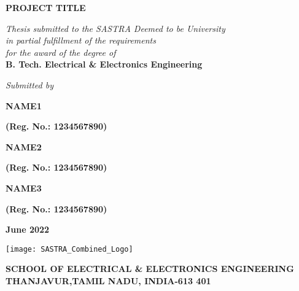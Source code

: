 \documentclass[a4paper, 12pt, oneside]{sastra}
\begin{document}
\onehalfspacing
	
	\thispagestyle{empty}
	\begin{center}
		\Large{\textbf{PROJECT TITLE}}
	\end{center}
	\bigskip{}
	\bigskip{}
	\bigskip{}
	\begin{center}
		\textit{Thesis submitted to the SASTRA Deemed to be University\\ 
			in partial fulfillment of the requirements\\
			for the award of the degree of\\
		}
		\bigskip{}
		\bigskip{}
		\large{\textbf{B. Tech. Electrical \& Electronics Engineering}}
		\bigskip{}
		\bigskip{}
		\bigskip{}
		\bigskip{}
		\bigskip{}
		\bigskip{}
	\end{center}
	\begin{center}
		\textit{Submitted by}\\
	\end{center}
	\begin{center}
		\begin{singlespacing}
			\textbf{\Large{NAME1}}
			
			\textbf{\large{(Reg. No.: 1234567890)}}
			
			\textbf{\Large{NAME2}}
			
			\textbf{\large{(Reg. No.: 1234567890)}}
			
			\textbf{\Large{NAME3}}
			
			\textbf{\large{(Reg. No.: 1234567890)}}
		\end{singlespacing}
	\end{center}
	\bigskip{}
	
	\begin{center}
		\Large{\textbf{June 2022}}   %
	\end{center}
	\bigskip{}
	\begin{center}
		\texttt{[image: SASTRA\_Combined\_Logo]}
	\end{center}
	
	\begin{center}
		\large{\textbf{SCHOOL OF ELECTRICAL \& ELECTRONICS ENGINEERING}} %
		{\textbf{THANJAVUR,TAMIL NADU, INDIA-613 401}}
	\end{center}
	
\end{document}

